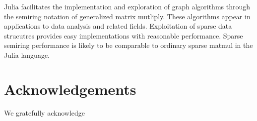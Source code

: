\documentclass[conference]{IEEEtran}
\begin{document}
Julia facilitates the implementation and exploration of graph algorithms through
the semiring notation of generalized matrix mutliply.  These algorithms appear
in applications to data analysis and related fields.  Exploitation of sparse data
strucutres provides easy implementations with reasonable performance.
Sparse semiring performance is likely to be comparable to ordinary sparse matmul in the Julia
language.

\section{Acknowledgements}

We gratefully acknowledge 



\end{document}
